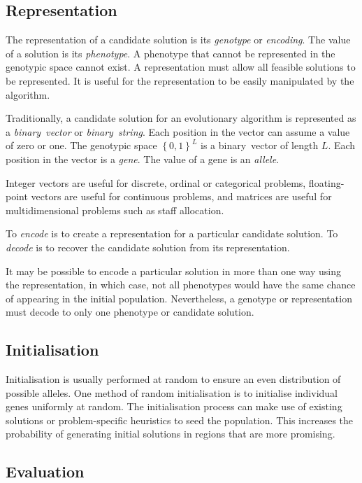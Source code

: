 \subsection{Representation}

The representation of a candidate solution is its \emph{genotype} or \emph{encoding}.
The value of a solution is its \emph{phenotype}.
A phenotype that cannot be represented in the genotypic space cannot exist.
A representation must allow all feasible solutions to be represented.
It is useful for the representation to be easily manipulated by the algorithm.

Traditionally, a candidate solution for an evolutionary algorithm is represented as a \emph{binary~vector} or \emph{binary~string}.
Each position in the vector can assume a value of zero or one.
The genotypic space \( \left\{ 0, 1 \right\}^{L} \) is a binary~vector of length \( L \)\@.
Each position in the vector is a \emph{gene}.
The value of a gene is an \emph{allele}.

Integer vectors are useful for discrete, ordinal or categorical problems, floating-point vectors are useful for continuous problems, and matrices are useful for multidimensional problems such as staff allocation.

To \emph{encode} is to create a representation for a particular candidate solution.
To \emph{decode} is to recover the candidate solution from its representation.

It may be possible to encode a particular solution in more than one way using the representation, in which case, not all phenotypes would have the same chance of appearing in the initial population.
Nevertheless, a genotype or representation must decode to only one phenotype or candidate solution.

\subsection{Initialisation}

Initialisation is usually performed at random to ensure an even distribution of possible alleles.
One method of random initialisation is to initialise individual genes uniformly at random.
The initialisation process can make use of existing solutions or problem-specific heuristics to seed the population.
This increases the probability of generating initial solutions in regions that are more promising.

\subsection{Evaluation}

